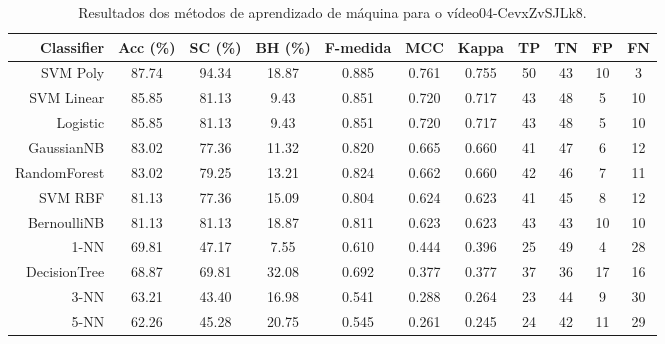 \begin{table}[!htb]
\centering
\caption{Resultados dos métodos de aprendizado de máquina para o vídeo04-CevxZvSJLk8.}
\label{tab:04-CevxZvSJLk8}
\begin{tabular}{r|c|c|c|c|c|c|c|c|c|c}
\hline\hline
Classifier & Acc (\%) & SC (\%) & BH (\%) & F-medida & MCC & Kappa & TP & TN & FP & FN \\ \hline
SVM Poly & 87.74 & 94.34 & 18.87 & 0.885 & 0.761 & 0.755 & 50 & 43 & 10 & 3 \\ 
SVM Linear & 85.85 & 81.13 & 9.43 & 0.851 & 0.720 & 0.717 & 43 & 48 & 5 & 10 \\ 
Logistic & 85.85 & 81.13 & 9.43 & 0.851 & 0.720 & 0.717 & 43 & 48 & 5 & 10 \\ 
GaussianNB & 83.02 & 77.36 & 11.32 & 0.820 & 0.665 & 0.660 & 41 & 47 & 6 & 12 \\ 
RandomForest & 83.02 & 79.25 & 13.21 & 0.824 & 0.662 & 0.660 & 42 & 46 & 7 & 11 \\ 
SVM RBF & 81.13 & 77.36 & 15.09 & 0.804 & 0.624 & 0.623 & 41 & 45 & 8 & 12 \\ 
BernoulliNB & 81.13 & 81.13 & 18.87 & 0.811 & 0.623 & 0.623 & 43 & 43 & 10 & 10 \\ 
1-NN & 69.81 & 47.17 & 7.55 & 0.610 & 0.444 & 0.396 & 25 & 49 & 4 & 28 \\ 
DecisionTree & 68.87 & 69.81 & 32.08 & 0.692 & 0.377 & 0.377 & 37 & 36 & 17 & 16 \\ 
3-NN & 63.21 & 43.40 & 16.98 & 0.541 & 0.288 & 0.264 & 23 & 44 & 9 & 30 \\ 
5-NN & 62.26 & 45.28 & 20.75 & 0.545 & 0.261 & 0.245 & 24 & 42 & 11 & 29 \\ 
\hline\hline
\end{tabular}
\end{table}
